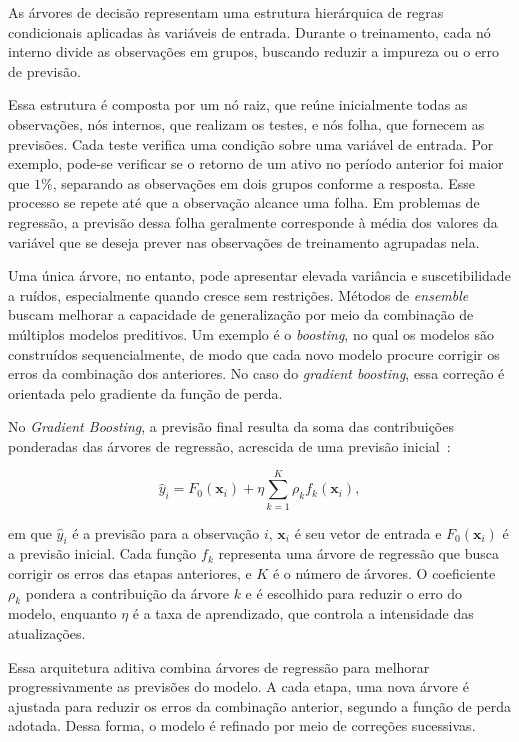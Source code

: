 As árvores de decisão representam uma estrutura hierárquica de
regras condicionais aplicadas às variáveis de entrada. Durante o
treinamento, cada nó interno divide as observações em grupos,
buscando reduzir a impureza ou o erro de previsão.

Essa estrutura é composta por um nó raiz, que reúne inicialmente
todas as observações, nós internos, que realizam os testes, e nós
folha, que fornecem as previsões. Cada teste verifica uma condição
sobre uma variável de entrada. Por exemplo, pode-se verificar se
o retorno de um ativo no período anterior foi maior que $1\%$,
separando as observações em dois grupos conforme a resposta.
Esse processo se repete até que a observação alcance uma folha.
Em problemas de regressão, a previsão dessa folha geralmente
corresponde à média dos valores da variável que se deseja prever
nas observações de treinamento agrupadas nela.

Uma única árvore, no entanto, pode apresentar elevada variância
e suscetibilidade a ruídos, especialmente quando cresce sem
restrições. Métodos de \textit{ensemble} buscam melhorar a
capacidade de generalização por meio da combinação de múltiplos
modelos preditivos. Um exemplo é o \textit{boosting}, no qual os
modelos são construídos sequencialmente, de modo que cada novo
modelo procure corrigir os erros da combinação dos anteriores.
No caso do \textit{gradient boosting}, essa correção é orientada
pelo gradiente da função de perda.

No \textit{Gradient Boosting}, a previsão final resulta da soma
das contribuições ponderadas das árvores de regressão,
acrescida de uma previsão inicial~\cite{friedman2001}:

\begin{equation}
    \hat{y}_i = F_0(\mathbf{x}_i)
    + \eta \sum_{k=1}^{K} \rho_k f_k(\mathbf{x}_i),
    \label{eq:gradient_boosting}
\end{equation}

\noindent em que $\hat{y}_i$ é a previsão para a observação $i$,
$\mathbf{x}_i$ é seu vetor de entrada e $F_0(\mathbf{x}_i)$
é a previsão inicial. Cada função $f_k$ representa uma árvore
de regressão que busca corrigir os erros das etapas anteriores,
e $K$ é o número de árvores. O coeficiente $\rho_k$ pondera
a contribuição da árvore $k$ e é escolhido para reduzir o erro
do modelo, enquanto $\eta$ é a taxa de aprendizado, que controla
a intensidade das atualizações.

Essa arquitetura aditiva combina árvores de regressão para
melhorar progressivamente as previsões do modelo. A cada etapa,
uma nova árvore é ajustada para reduzir os erros da combinação
anterior, segundo a função de perda adotada. Dessa forma, o
modelo é refinado por meio de correções sucessivas.

